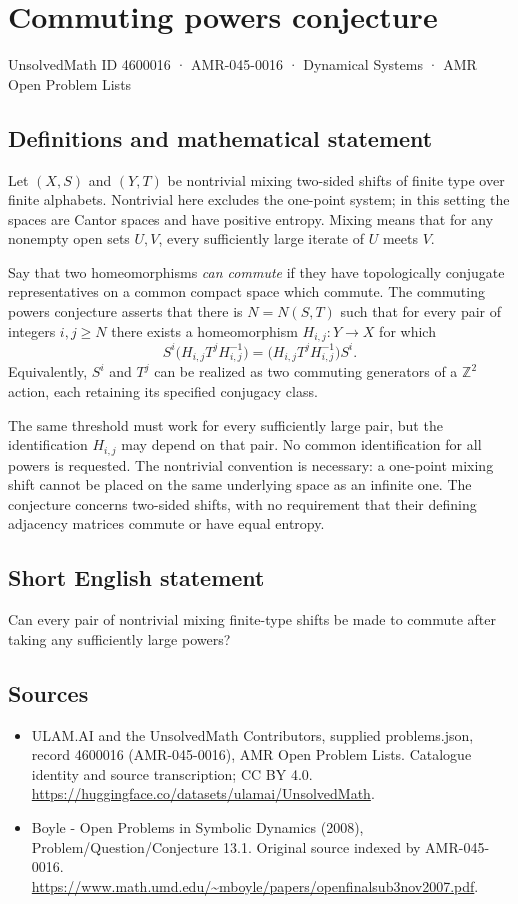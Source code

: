 \documentclass[11pt,a4paper]{article}
\begin{document}
\section*{Commuting powers conjecture}\label{4600016}
{\small UnsolvedMath ID 4600016 · AMR-045-0016 · Dynamical Systems · AMR Open Problem Lists}
\subsection{Definitions and mathematical statement}
Let $(X,S)$ and $(Y,T)$ be nontrivial mixing two-sided shifts of finite
type over finite alphabets. Nontrivial here excludes the one-point system;
in this setting the spaces are Cantor spaces and have positive entropy.
Mixing means that for any nonempty open sets $U,V$, every sufficiently
large iterate of $U$ meets $V$.

Say that two homeomorphisms \emph{can commute} if they have topologically
conjugate representatives on a common compact space which commute.
The commuting powers conjecture asserts that there is $N=N(S,T)$ such
that for every pair of integers $i,j\ge N$ there exists a homeomorphism
$H_{i,j}:Y\to X$ for which
\[
 S^i\bigl(H_{i,j}T^jH_{i,j}^{-1}\bigr)
   =\bigl(H_{i,j}T^jH_{i,j}^{-1}\bigr)S^i.
\]
Equivalently, $S^i$ and $T^j$ can be realized as two commuting generators
of a $\mathbb Z^2$ action, each retaining its specified conjugacy class.

The same threshold must work for every sufficiently large pair, but the
identification $H_{i,j}$ may depend on that pair. No common identification
for all powers is requested. The nontrivial convention is necessary:
a one-point mixing shift cannot be placed on the same underlying space
as an infinite one. The conjecture concerns two-sided shifts, with no
requirement that their defining adjacency matrices commute or have equal
entropy.
\subsection{Short English statement}
Can every pair of nontrivial mixing finite-type shifts be made to commute after taking any sufficiently large powers?
\subsection{Sources}
\begin{itemize}
\item[S1] ULAM.AI and the UnsolvedMath Contributors, supplied problems.json, record 4600016 (AMR-045-0016), AMR Open Problem Lists. Catalogue identity and source transcription; CC BY 4.0.
\url{https://huggingface.co/datasets/ulamai/UnsolvedMath}.
\item[S2] Boyle - Open Problems in Symbolic Dynamics (2008), Problem/Question/Conjecture 13.1. Original source indexed by AMR-045-0016.
\url{https://www.math.umd.edu/~mboyle/papers/openfinalsub3nov2007.pdf}.
\end{itemize}
\end{document}
